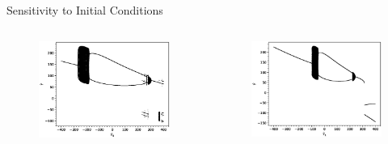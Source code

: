 \documentclass{beamer}
\begin{document}
\begin{frame}{Sensitivity to Initial Conditions}
	\begin{columns}
	\begin{column}{0.5\textwidth}
		\begin{figure}
			\centering
			\includegraphics[width=1.2\textwidth]{y0bifurcation.eps}
		\end{figure}
	\end{column}
	\begin{column}{0.5\textwidth}
		\begin{figure}
			\centering
			\includegraphics[width=1.2\textwidth]{y1bifurcation.eps}
		\end{figure}
	\end{column}
	\end{columns}
\end{frame}
\end{document}
